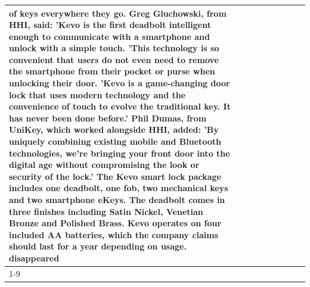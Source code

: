\begin{table}[H]
\begin{tabular}{lllrlllll}
of keys everywhere they go. Greg Gluchowski, from HHI, said: 'Kevo is the first deadbolt intelligent enough to communicate with a smartphone and unlock with a simple touch. 'This technology is so convenient that users do not even need to remove the smartphone from their pocket or purse when unlocking their door. 'Kevo is a game-changing door lock that uses modern technology and the convenience of touch to evolve the traditional key. It has never been done before.' Phil Dumas, from UniKey, which worked alongside HHI, added: 'By uniquely combining existing mobile and Bluetooth technologies, we’re bringing your front door into the digital age without compromising the look or security of the lock.' The Kevo smart lock package includes one deadbolt, one fob, two mechanical keys and two smartphone eKeys. The deadbolt comes in three finishes including Satin Nickel, Venetian Bronze and Polished Brass. Kevo operates on four included AA batteries, which the company claims should last for a year depending on usage. disappeared \\
\cline{1-9}

\end{tabular}
\end{table}
